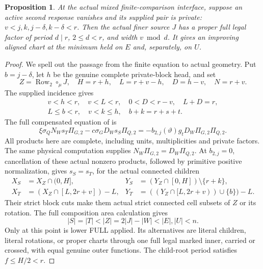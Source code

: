 \documentclass[11pt,a4paper]{amsart}
\numberwithin{equation}{section}
\theoremstyle{plain}
\newtheorem{proposition}[theorem]{Proposition}
\theoremstyle{definition}
\newcommand{\Row}{\operatorname{Row}}
\begin{document}
\begin{proposition}\label{ge:zero-second-response}
At the actual mixed finite-comparison interface, suppose an active second
response vanishes and its supplied pair is private:
\(v<j,k,j-\delta,k-\delta<r\).  Then the actual finer source
\(J\) has a proper full legal factor of period \(d\mid r\),
\(2\le d<r\), and width \(v\bmod d\).  It gives an improving aligned
chart at the minimum held on \(E\) and, separately, on \(U\).
\end{proposition}
\begin{proof}
We spell out the passage from the finite equation to actual geometry.
Put \(b=j-\delta\), let \(h\) be the genuine complete private-block
head, and set
\[
 Z=\Row_2\circ_\mu J,\quad H=r+h,\quad
 L=r+v-h,\quad D=h-v,\quad N=r+v.
\]
The supplied incidence gives
\[
 \begin{gathered}
 v<h<r,\quad v<L<r,\quad 0<D<r-v,\quad L+D=r,\\
 L\le b<r,\quad v<k\le h,\quad b+k=r+s+t.
 \end{gathered}
\]
The full compensated equation of  is
\begin{equation}\label{ge:eq:whole-two-copy}
 \xi\sigma_Q N_Ws_T\Pi_{G,2}
 -c\sigma_G D_Ws_S\Pi_{Q,2}
 =-b_{2,j}(\vartheta)g_tD_W\Pi_{G,2}\Pi_{Q,2}.
\end{equation}
All products here are complete, including units, multiplicities and
private factors.  The same physical computation supplies
\(N_W\Pi_{G,2}=D_W\Pi_{Q,2}\).  At \(b_{2,j}=0\), cancellation of
these actual nonzero products, followed by primitive positive
normalization, gives \(s_S=s_T\), for the actual connected children
\begin{equation}\label{ge:eq:mixed-amplified-cuts}
\begin{aligned}
 X_S&=X_Z\cap(0,H],&Y_S&=(Y_Z\cap[0,H])\setminus\{r+k\},\\
 X_T&=(X_Z\cap[L,2r+v])-L,&
 Y_T&=((Y_Z\cap[L,2r+v))\cup\{b\})-L.
\end{aligned}
\end{equation}
Their strict block cuts make them actual strict connected cell subsets
of \(Z\) or its rotation.  The full composition area calculation gives
\[
 |S|=|T|<|Z|=2|J|-|W|<|E|,|U|<n.
\]
Only at this point is lower FULL applied.  Its alternatives are literal
children, literal rotations, or proper charts through one full legal
marked inner, carried or crossed, with equal genuine outer functions.
The child-root period satisfies \(f\le H/2<r\).


\end{proof}
\end{document}
